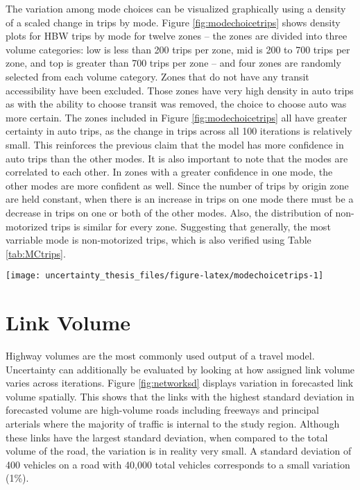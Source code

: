 \documentclass[fancy, masters,twoside]{byuthesis}
\begin{document}
The variation among mode choices can be visualized graphically using a density of a scaled change in trips by mode. Figure \ref{fig:modechoicetrips} shows density plots for HBW trips by mode for twelve zones -- the zones are divided into three volume categories: low is less than 200 trips per zone, mid is 200 to 700 trips per zone, and top is greater than 700 trips per zone -- and four zones are randomly selected from each volume category. Zones that do not have any transit accessibility have been excluded. Those zones have very high density in auto trips as with the ability to choose transit was removed, the choice to choose auto was more certain. The zones included in Figure \ref{fig:modechoicetrips} all have greater certainty in auto trips, as the change in trips across all 100 iterations is relatively small. This reinforces the previous claim that the model has more confidence in auto trips than the other modes. It is also important to note that the modes are correlated to each other. In zones with a greater confidence in one mode, the other modes are more confident as well. Since the number of trips by origin zone are held constant, when there is an increase in trips on one mode there must be a decrease in trips on one or both of the other modes. Also, the distribution of non-motorized trips is similar for every zone. Suggesting that generally, the most varriable mode is non-motorized trips, which is also verified using Table \ref{tab:MCtrips}.

\begin{sidewaysfigure}

{\centering \texttt{[image: uncertainty\_thesis\_files/figure-latex/modechoicetrips-1]} 

}

\caption{Trip desnity for coefficient of variation by mode for HBW trips.}\label{fig:modechoicetrips}
\end{sidewaysfigure}

\hypertarget{link-volume}{%
\section{Link Volume}\label{link-volume}}

Highway volumes are the most commonly used output of a travel model. Uncertainty can additionally be evaluated by looking at how assigned link volume varies across iterations. Figure \ref{fig:networksd} displays variation in forecasted link volume spatially. This shows that the links with the highest standard deviation in forecasted volume are high-volume roads including freeways and principal arterials where the majority of traffic is internal to the study region. Although these links have the largest standard deviation, when compared to the total volume of the road, the variation is in reality very small. A standard deviation of 400 vehicles on a road with 40,000 total vehicles corresponds to a small variation (1\%).
\end{document}
